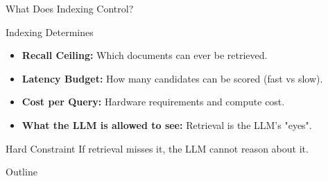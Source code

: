 \documentclass[aspectratio=169]{beamer}
\newif\ifanimated
\newcommand{\cpause}{\ifanimated\pause\fi}
\begin{document}
\begin{frame}{What Does Indexing Control?}
\begin{block}{Indexing Determines}
\begin{itemize}
    \item \textbf{Recall Ceiling:} Which documents can ever be retrieved.
    \item \textbf{Latency Budget:} How many candidates can be scored (fast vs slow).
    \item \textbf{Cost per Query:} Hardware requirements and compute cost.
    \item \textbf{What the LLM is allowed to see:} Retrieval is the LLM's "eyes".
\end{itemize}
\end{block}
\cpause

\vspace{1em}

\begin{center}

\end{center}

\vspace{0.5em}

\begin{alertblock}{Hard Constraint}
If retrieval misses it, the LLM cannot reason about it.
\end{alertblock}
\cpause
\end{frame}




\begin{frame}{Outline}
\tableofcontents
\end{frame}
\end{document}
